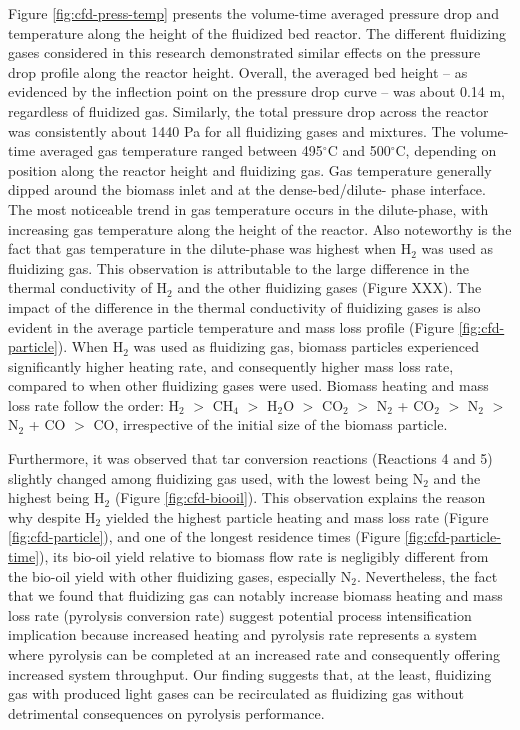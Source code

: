 Figure \ref{fig:cfd-press-temp} presents the volume-time averaged pressure drop and temperature along the height of the fluidized bed reactor. The different fluidizing gases considered in this research demonstrated similar effects on the pressure drop profile along the reactor height. Overall, the averaged bed height – as evidenced by the inflection point on the pressure drop curve – was about 0.14 m, regardless of fluidized gas. Similarly, the total pressure drop across the reactor was consistently about 1440 Pa for all fluidizing gases and mixtures. The volume-time averaged gas temperature ranged between 495$^\circ$C and 500$^\circ$C, depending on position along the reactor height and fluidizing gas. Gas temperature generally dipped around the biomass inlet and at the dense-bed/dilute- phase interface. The most noticeable trend in gas temperature occurs in the dilute-phase, with increasing gas temperature along the height of the reactor. Also noteworthy is the fact that gas temperature in the dilute-phase was highest when H$_2$ was used as fluidizing gas. This observation is attributable to the large difference in the thermal conductivity of H$_2$ and the other fluidizing gases (Figure XXX). The impact of the difference in the thermal conductivity of fluidizing gases is also evident in the average particle temperature and mass loss profile (Figure \ref{fig:cfd-particle}). When H$_2$ was used as fluidizing gas, biomass particles experienced significantly higher heating rate, and consequently higher mass loss rate, compared to when other fluidizing gases were used. Biomass heating and mass loss rate follow the order: H$_2$ $>$ CH$_4$ $>$ H$_2$O $>$ CO$_2$ $>$ N$_2$ + CO$_2$ $>$ N$_2$ $>$ N$_2$ + CO $>$ CO, irrespective of the initial size of the biomass particle.

Furthermore, it was observed that tar conversion reactions (Reactions 4 and 5) slightly changed among fluidizing gas used, with the lowest being N$_2$ and the highest being H$_2$ (Figure \ref{fig:cfd-biooil}). This observation explains the reason why despite H$_2$ yielded the highest particle heating and mass loss rate (Figure \ref{fig:cfd-particle}), and one of the longest residence times (Figure \ref{fig:cfd-particle-time}), its bio-oil yield relative to biomass flow rate is negligibly different from the bio-oil yield with other fluidizing gases, especially N$_2$. Nevertheless, the fact that we found that fluidizing gas can notably increase biomass heating and mass loss rate (pyrolysis conversion rate) suggest potential process intensification implication because increased heating and pyrolysis rate represents a system where pyrolysis can be completed at an increased rate and consequently offering increased system throughput. Our finding suggests that, at the least, fluidizing gas with produced light gases can be recirculated as fluidizing gas without detrimental consequences on pyrolysis performance.

